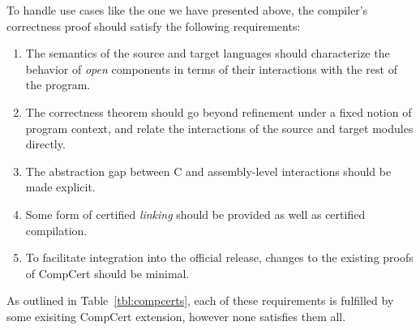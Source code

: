 \documentclass[draft,11pt]{report}
\begin{document}
To handle use cases like the one we have presented above,
the compiler's correctness proof
should satisfy the following requirements:
\begin{enumerate}
\item \label{req:opensem}
  The semantics of the source and target languages
  should characterize the behavior of \emph{open} components
  in terms of their interactions with the rest of the program.
\item \label{req:opensim}
  The correctness theorem
  should go beyond refinement under a fixed notion of program context, and relate
  the interactions of the source and target modules directly.
\item \label{req:openabs}
  The abstraction gap between C and assembly-level
  interactions should be made explicit.
\item \label{req:linking}
  Some form of certified \emph{linking}
  should be provided as well as certified compilation.
\item \label{req:complexity}
  To facilitate integration into the official release,
  changes to the existing proofs of CompCert
  should be minimal.
\end{enumerate}
As outlined in Table~\ref{tbl:compcerts},
each of these requirements is fulfilled
by some exisiting CompCert extension,
however none satisfies them all.
%


\end{document}
